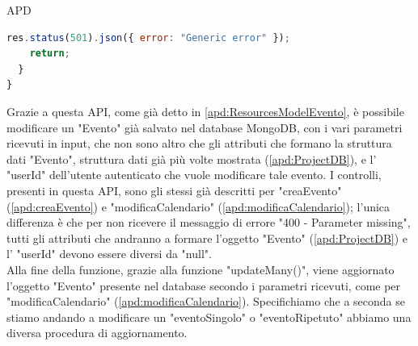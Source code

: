 \begin{listaPersonale} {APD}
\begin{listaPersonale2}[APD]{}
\begin{lstlisting}[language=JavaScript]
    res.status(501).json({ error: "Generic error" });
    return;
  }
}
            \end{lstlisting}
                Grazie a questa API, come già detto in \ref{apd:ResourcesModelEvento}, è possibile modificare un "Evento" già salvato nel database MongoDB, con i vari parametri ricevuti in input, che non sono altro che gli attributi che formano la struttura dati "Evento", struttura dati già più volte mostrata (\ref{apd:ProjectDB}), e l' "userId" dell'utente autenticato che vuole modificare tale evento. I controlli, presenti in questa API, sono gli stessi già descritti per "creaEvento" (\ref{apd:creaEvento}) e "modificaCalendario" (\ref{apd:modificaCalendario}); l'unica differenza è che per non ricevere il messaggio di errore "400 - Parameter missing", tutti gli attributi che andranno a formare l'oggetto "Evento" (\ref{apd:ProjectDB}) e l' "userId" devono essere diversi da "null". \\
                Alla fine della funzione, grazie alla funzione "updateMany()", viene aggiornato l'oggetto "Evento" presente nel database secondo i parametri ricevuti, come per "modificaCalendario" (\ref{apd:modificaCalendario}). Specifichiamo che a seconda se stiamo andando a modificare un "eventoSingolo" o "eventoRipetuto" abbiamo una diversa procedura di aggiornamento.

\end{listaPersonale2}
\end{listaPersonale}
